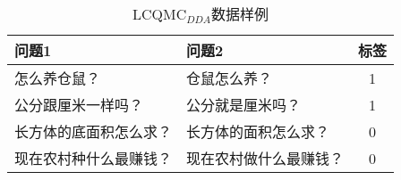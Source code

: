 \begin{table}
    \caption{LCQMC$_{DDA}$数据样例}
    \centering
    \newcommand{\tabincell}[2]{\begin{tabular}{@{}#1@{}}#2\end{tabular}}
    \begin{tabular}{llc}
    \toprule[0.7pt]
    \textbf{问题1} &  \textbf{问题2} & \textbf{标签} \\
    \midrule[0.7pt]

    怎么养仓鼠？ & 仓鼠怎么养？& 1 \\
    \midrule[0.4pt]
    公分跟厘米一样吗？ & 公分就是厘米吗？ & 1\\
    \midrule[0.4pt]
    长方体的底面积怎么求？ & 长方体的面积怎么求？ &  0 \\
    \midrule[0.4pt]
    现在农村种什么最赚钱？\quad\; & 现在农村做什么最赚钱？\;\; & 0 \\
    \bottomrule[0.7pt]
    \end{tabular}
    \label{table4-4}
\end{table}